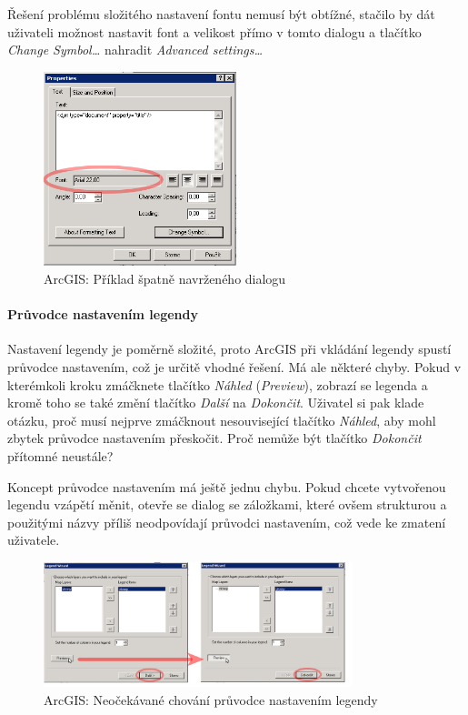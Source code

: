 \documentclass[a4paper,12pt,draft]{article}
\begin{document}
Řešení problému složitého nastavení fontu nemusí být obtížné,
stačilo by dát uživateli možnost nastavit font a velikost přímo v
tomto dialogu a tlačítko \emph{Change Symbol\ldots} nahradit \emph{Advanced
settings\ldots}

\begin{figure}[h!]
    \centering
    \includegraphics[width=0.5\textwidth]{./GUI_screenshots/ArcGIS_text_dialog.png}
    \caption{ArcGIS: Příklad špatně navrženého dialogu}
    \label{fig:ArcGIS_text_dialog}
\end{figure}

\paragraph*{Průvodce nastavením legendy}  Nastavení legendy je poměrně
složité, proto ArcGIS při vkládání legendy spustí průvodce nastavením,
což je určitě vhodné řešení. Má ale některé chyby. Pokud v
kterémkoli kroku zmáčknete tlačítko \emph{Náhled} (\emph{Preview}),
zobrazí se legenda a kromě toho se také změní tlačítko \emph{Další}
na \emph{Dokončit}. Uživatel si pak klade otázku, proč musí nejprve
zmáčknout nesouvisející tlačítko \emph{Náhled}, aby mohl zbytek
průvodce nastavením přeskočit. Proč nemůže být tlačítko
\emph{Dokončit} přítomné neustále?

Koncept průvodce nastavením má ještě jednu chybu. Pokud chcete vytvořenou
legendu vzápětí měnit, otevře se dialog se záložkami, které ovšem
strukturou a použitými názvy příliš neodpovídají průvodci nastavením,
což vede ke zmatení uživatele.

\begin{figure}[h!]
\centering
\includegraphics[width=0.8\textwidth]{./GUI_screenshots/ArcGIS_legend_wizard.png}
\caption{ArcGIS: Neočekávané chování průvodce nastavením legendy}
\label{fig:ArcGIS_legend_wizard}
\end{figure}
\end{document}
